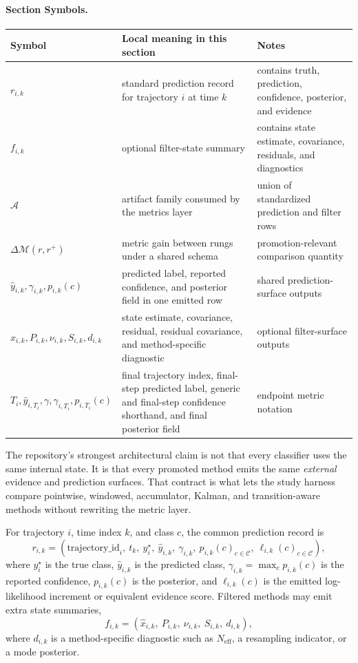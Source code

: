 \documentclass[11pt]{article}
\newcommand{\sectionsymbol}[3]{#1 & #2 & #3 \\}
\newcommand{\sectionsymbols}[1]{%
\begin{center}
\small
\setlength{\tabcolsep}{4pt}
\begin{tabularx}{0.95\textwidth}{>{\raggedright\arraybackslash}p{0.16\textwidth}X>{\raggedright\arraybackslash}p{0.18\textwidth}}
\toprule
Symbol & Local meaning in this section & Notes \\
\midrule
#1
\bottomrule
\end{tabularx}
\end{center}
}
\begin{document}
\paragraph{Section Symbols.}
\sectionsymbols{
\sectionsymbol{\(r_{i,k}\)}{standard prediction record for trajectory \(i\) at time \(k\)}{contains truth, prediction, confidence, posterior, and evidence}
\sectionsymbol{\(f_{i,k}\)}{optional filter-state summary}{contains state estimate, covariance, residuals, and diagnostics}
\sectionsymbol{\(\mathcal{A}\)}{artifact family consumed by the metrics layer}{union of standardized prediction and filter rows}
\sectionsymbol{\(\Delta \mathcal{M}(r,r^+)\)}{metric gain between rungs under a shared schema}{promotion-relevant comparison quantity}
\sectionsymbol{\(\hat{y}_{i,k}, \gamma_{i,k}, p_{i,k}(c)\)}{predicted label, reported confidence, and posterior field in one emitted row}{shared prediction-surface outputs}
\sectionsymbol{\(\hat{x}_{i,k}, P_{i,k}, \nu_{i,k}, S_{i,k}, d_{i,k}\)}{state estimate, covariance, residual, residual covariance, and method-specific diagnostic}{optional filter-surface outputs}
\sectionsymbol{\(T_i, \hat{y}_{i,T_i}, \gamma, \gamma_{i,T_i}, p_{i,T_i}(c)\)}{final trajectory index, final-step predicted label, generic and final-step confidence shorthand, and final posterior field}{endpoint metric notation}
}

\noindent
The repository's strongest architectural claim is not that every classifier uses
the same internal state. It is that every promoted method emits the same
\emph{external} evidence and prediction surfaces. That contract is what lets the
study harness compare pointwise, windowed, accumulator, Kalman, and
transition-aware methods without rewriting the metric layer.

For trajectory \(i\), time index \(k\), and class \(c\), the common prediction
record is
\begin{equation}
r_{i,k}
=
(\mathrm{trajectory\_id}_i,\ t_k,\ y_i^\star,\ \hat{y}_{i,k},\ \gamma_{i,k},\ p_{i,k}(c)_{c \in \mathcal{C}},\ \ell_{i,k}(c)_{c \in \mathcal{C}}),
\end{equation}
where \(y_i^\star\) is the true class, \(\hat{y}_{i,k}\) is the predicted
class, \(\gamma_{i,k} = \max_c p_{i,k}(c)\) is the reported confidence,
\(p_{i,k}(c)\) is the posterior, and \(\ell_{i,k}(c)\) is the emitted
log-likelihood increment or equivalent evidence score. Filtered methods may
emit extra state summaries,
\begin{equation}
f_{i,k}
=
(\hat{x}_{i,k},\ P_{i,k},\ \nu_{i,k},\ S_{i,k},\ d_{i,k}),
\end{equation}
where \(d_{i,k}\) is a method-specific diagnostic such as
\(N_{\mathrm{eff}}\), a resampling indicator, or a mode posterior.
\end{document}
